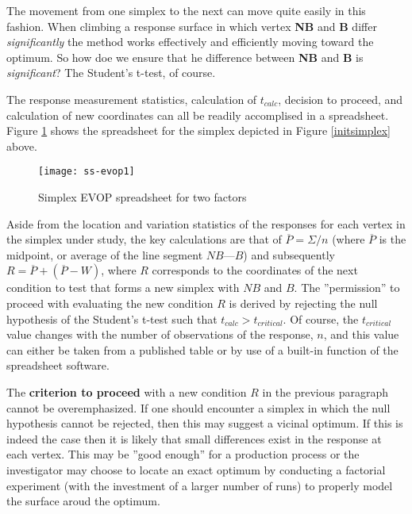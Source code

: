The movement from one simplex to the next can move quite easily in this fashion.  When climbing a response surface in which vertex \textbf{NB} and \textbf{B} differ \textit{significantly} the method works effectively and efficiently moving toward the optimum.  So how doe we ensure that he difference between \textbf{NB} and \textbf{B} is \textit{significant}?  The Student's t-test, of course.

The response measurement statistics, calculation of $t_{calc}$, decision to proceed, and calculation of new coordinates can all be readily accomplised in a spreadsheet.  Figure \ref{ss-evop1} shows the spreadsheet for the simplex depicted in Figure \ref{initsimplex} above.

\begin{figure}[h]\caption{Simplex EVOP spreadsheet for two factors}\label{ss-evop1}
\begin{center}
\texttt{[image: ss-evop1]}
\end{center}
\end{figure}


Aside from the location and variation statistics of the responses for each vertex in the simplex under study, the key calculations are that of $\overline{P} = \Sigma/n$ (where $\overline{P}$ is the midpoint, or average of the line segment $NB$---$B$) and subsequently $R = \overline{P} + (\overline{P} - W)$, where $R$ corresponds to the coordinates of the next condition to test that forms a new simplex with $NB$ and $B$. The ''permission'' to proceed with evaluating the new condition $R$ is derived by rejecting the null hypothesis of the Student's t-test such that  $t_{calc} > t_{critical}$.  Of course, the $t_{critical}$ value changes with the number of observations of the response, $n$, and this value can either be taken from a published table or by use of a built-in function of the spreadsheet software.

The \textbf{criterion to proceed} with a new condition $R$ in the previous paragraph cannot be overemphasized. If one should encounter a simplex in which the null hypothesis cannot be rejected, then this may suggest a vicinal optimum. If this is indeed the case then it is likely that small differences exist in the response at each vertex.  This may be ''good enough'' for a production process or the investigator may choose to locate an exact optimum by conducting a factorial experiment (with the investment of a larger number of runs) to properly model the surface aroud the optimum.

